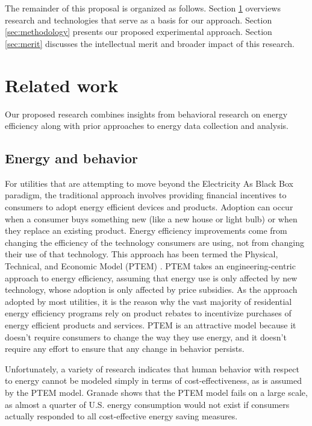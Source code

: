 The remainder of this proposal is organized as follows.  Section
\ref{sec:related-work} overviews research and technologies that serve as a
basis for our approach.  Section \ref{sec:methodology} presents our proposed
experimental approach.  Section \ref{sec:merit} discusses the intellectual
merit and broader impact of this research. 

\section{Related work}
\label{sec:related-work}

Our proposed research combines insights from behavioral research on energy
efficiency along with prior approaches to energy data collection and analysis.

\subsection{Energy and behavior}

For utilities that are attempting to move beyond the Electricity As Black
Box paradigm, the traditional approach involves providing financial
incentives to consumers to adopt energy efficient devices and products.
Adoption can occur when a consumer buys something new (like a new house or
light bulb) or when they replace an existing product.  Energy efficiency
improvements come from changing the efficiency of the technology consumers
are using, not from changing their use of that technology.  This approach
has been termed the Physical, Technical, and Economic Model (PTEM)
\cite{Lutzenhiser93}.  PTEM takes an engineering-centric approach to energy
efficiency, assuming that energy use is only affected by new technology,
whose adoption is only affected by price subsidies. As the approach adopted
by most utilities, it is the reason why the vast majority of residential
energy efficiency programs rely on product rebates to incentivize purchases
of energy efficient products and services. PTEM is an attractive model
because it doesn't require consumers to change the way they use energy, and
it doesn't require any effort to ensure that any change in behavior
persists.

Unfortunately, a variety of research indicates that human behavior with
respect to energy cannot be modeled simply in terms of cost-effectiveness,
as is assumed by the PTEM model.  Granade \cite{Granade09} shows that the
PTEM model fails on a large scale, as almost a quarter of U.S. energy
consumption would not exist if consumers actually responded to all
cost-effective energy saving measures.


